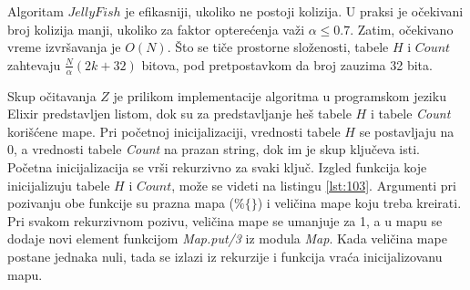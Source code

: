 \documentclass[12pt,oneside]{memoir}
\begin{document}
\begin{comment}

\begin{figure}[!ht]
  \centering
  \texttt{[image: 58\_3algoritma.PNG]}
  \caption{Razmatra se skup 4-mera $Z = \{AC; CG; AC; GT; CA; GG; AC; GT\}$: (a) Ilustruje jednostavan metod za brojanje k-mera koji koristi tabelu \textit{Count} veličine 4k. (b) Ilustruje \textit{JellyFish} metod brojanja k-mera koja koristi heš tabelu veličine 7. Heš funkcija je $h(z) = b(z)$ \textit{mod} $7$. Na primer, $GT$ se čuva u tabeli $Count$ sa indeksom 4, jer je $h(GT) = 4$. U ovom primeru se javlja jedna kolizija. Pošto je i $h(CA) = 4$, $CA$ je u koliziji sa $GT$. Linearnim isprobavanjem $CA$ se ipak čuva u tabeli $Count$ sa indeksom 5. (c) Ilustruje DSK metod brojanja k-mera.
Pretpostavka je da je $h(z) = b(z)$, $n_{list} = 2$ i $n_{sublist} = 2$. DSK deli Z u
4 ($= n_{list} * n_{sublist}$) podliste, a zatim pokreće \textit{JellyFish} algoritam za brojanje k-mera u svakoj podlisti.}
  \label{fig:5}
  \source{\cite{WingKinSung}}
\end{figure}

Slika \ref{fig:5}(b) daje primer koji ilustruje algoritam $JellyFish$. 
\end{comment}

Algoritam $JellyFish$ je efikasniji, ukoliko ne postoji kolizija. U praksi je očekivani broj kolizija manji, ukoliko za faktor opterećenja važi $\alpha \leq 0.7$. Zatim, očekivano vreme izvršavanja je $O(N)$. Što se tiče prostorne složenosti, tabele $H$ i $Count$ zahtevaju $\frac{N}{\alpha}(2k + 32)$ bitova, pod pretpostavkom da broj zauzima 32 bita.

Skup očitavanja $Z$ je prilikom implementacije algoritma u programskom jeziku Elixir predstavljen listom, dok su za predstavljanje heš tabele $H$ i tabele \textit{Count} korišćene mape. Pri početnoj inicijalizaciji, vrednosti tabele $H$ se postavljaju na 0, a vrednosti tabele \textit{Count} na prazan string, dok im je skup ključeva isti. Početna inicijalizacija se vrši rekurzivno za svaki ključ. Izgled funkcija koje inicijalizuju tabele $H$ i $Count$, može se videti na listingu \ref{lst:103}. Argumenti pri pozivanju obe funkcije su prazna mapa ($\%\{\}$) i veličina mape koju treba kreirati. Pri svakom rekurzivnom pozivu, veličina mape se umanjuje za 1, a u mapu se dodaje novi element funkcijom \textit{Map.put/3} iz modula \textit{Map}. Kada veličina mape postane jednaka nuli, tada se izlazi iz rekurzije i funkcija vraća inicijalizovanu mapu. 
\end{document}
